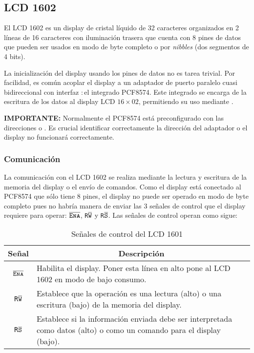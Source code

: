 
\newcommand{\ENA}{$\overline{\mbox{\texttt{\textsc{Ena}}}}$}
\newcommand{\RW}{\texttt{R}$\overline{\mbox{\texttt{W}}}$}
\newcommand{\RS}{\texttt{R}$\overline{\mbox{\texttt{S}}}$}

\subsection{LCD 1602 \IIC{}}%
\label{sec:intro-lcd1602}

El LCD 1602 es un display de cristal líquido de 32 caracteres organizados en 2 líneas de 16 caracteres con iluminación trasera que cuenta con 8 pines de datos que pueden ser usados en modo de byte completo o por \emph{nibbles} (dos segmentos de 4 bits).

La inicialización del display usando los pines de datos no es tarea trivial.
Por facilidad, es común acoplar el display a un adaptador de puerto paralelo cuasi bidireccional con interfaz \IIC{}:\,el integrado PCF8574.
Este integrado  se encarga de la escritura de los datos al display LCD $16\times02$, permitiendo su uso mediante \IIC{}.

\medskip

\noindent \textbf{IMPORTANTE:} Normalmente el PCF8574 está preconfigurado con las direcciones \IIC{}  o .
Es crucial identificar correctamente la dirección \IIC{} del adaptador o el display no funcionará correctamente.

\subsubsection{Comunicación}

La comunicación con el LCD 1602 se realiza mediante la lectura y escritura de la memoria del display o el envío de comandos.
Como el display está conectado al PCF8574 que sólo tiene 8 pines, el display no puede ser operado en modo de byte completo pues no habría manera de enviar las 3 señales de control que el display requiere para operar:
\ENA{}, \RW{} y \RS{}.
Las señales de control operan como sigue:

\begin{table}[H]
	\centering
	\caption{Señales de control del LCD 1601}%
	\label{tbl:lcd-control-signals}
	\begin{tabularx}{0.9\linewidth}{c X}
		\toprule
		\multicolumn{1}{c}{\bfseries Señal} &
		\multicolumn{1}{c}{\bfseries Descripción} \\
		\midrule
		\ENA{} & Habilita el display. Poner esta línea en alto pone al LCD 1602 en modo de bajo consumo. \\

		\RW{}  & Establece que la operación es una lectura (alto) o una escritura (bajo) de la memoria del display. \\

		\RS{}  & Establece si la información enviada debe ser interpretada como datos (alto) o como un comando para el display (bajo). \\
		\bottomrule
	\end{tabularx}
\end{table}


